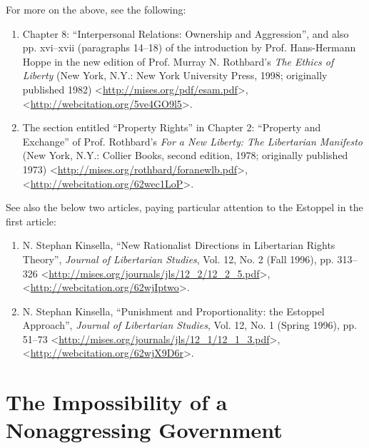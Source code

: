 \documentclass[letterpaper,12pt]{article}
\makeatletter
\newcommand{\asterism}{\smash{%
  \raisebox{-.5ex}{%
    \setlength{\tabcolsep}{-.5pt}%
    \begin{tabular}{@{}cc@{}}%
      \multicolumn2c*\\[-2ex]*&*%
    \end{tabular}}}}
\makeatother
\begin{document}
\vspace{1em}
\centerline{\asterism}
\vspace{1em}

For more on the above, see the following:

\begin{enumerate}
\small
\item Chapter 8: ``Interpersonal Relations: Ownership and Aggression'', and also pp. xvi--xvii (paragraphs 14--18) of the introduction by Prof. Hans-Hermann Hoppe in the new edition of Prof. Murray N. Rothbard's \emph{The Ethics of Liberty} (New York, N.Y.: New York University Press, 1998; originally published 1982) \textless\url{http://mises.org/pdf/esam.pdf}\textgreater , \textless\url{http://webcitation.org/5ve4GO9l5}\textgreater .

\item The section entitled ``Property Rights'' in Chapter 2: ``Property and Exchange'' of Prof. Rothbard's \emph{For a New Liberty: The Libertarian Manifesto} (New York, N.Y.: Collier Books, second edition, 1978; originally published 1973) \textless\url{http://mises.org/rothbard/foranewlb.pdf}\textgreater , \textless\url{http://webcitation.org/62wec1LoP}\textgreater .
\end{enumerate}

See also the below two articles, paying particular attention to the Estoppel in the first article:

\begin{enumerate}
\small
\setcounter{enumi}{2}
\item N. Stephan Kinsella, ``New Rationalist Directions in Libertarian Rights Theory'', \emph{Journal of Libertarian Studies}, Vol. 12, No. 2 (Fall 1996), pp. 313--326 \textless\url{http://mises.org/journals/jls/12_2/12_2_5.pdf}\textgreater , \textless\url{http://webcitation.org/62wjIptwo}\textgreater .

\item N. Stephan Kinsella, ``Punishment and Proportionality: the Estoppel Approach'', \emph{Journal of Libertarian Studies}, Vol. 12, No. 1 (Spring 1996), pp. 51--73 \textless\url{http://mises.org/journals/jls/12_1/12_1_3.pdf}\textgreater , \textless\url{http://webcitation.org/62wjX9D6r}\textgreater .
\end{enumerate}

\section{The Impossibility of a Nonaggressing Government}
\label{sec:ImpossibilityOfANonaggressingGovernment}
\end{document}
